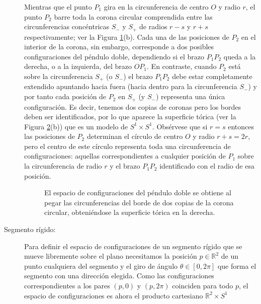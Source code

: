 \documentclass[\main/VD_completo.tex]{subfiles}
\begin{document}
\begin{description}
  Mientras que el punto $P_1$ gira en la circunferencia de centro $O$ y radio
  $r$, el punto $P_2$ barre toda la corona circular comprendida entre las
  circunferencias concéntricas $S_-$ y $S_+$ de radios $r-s$ y $r+s$
  respectivamente; ver la Figura \ref{fig20y30}(b). Cada una de las posiciones
  de $P_2$ en el interior de la corona, sin embargo, corresponde a dos posibles
  configuraciones del péndulo doble, dependiendo si el brazo $P_1P_2$ queda a la
  derecha, o a la izquierda, del brazo $OP_1$. En contraste, cuando $P_2$ está
  sobre la circunferencia $S_+$ (o $S_-$) el brazo $P_1P_2$ debe estar
  completamente extendido apuntando hacia fuera (hacia dentro para la
  circunferencia $S_-$) y por tanto cada posición de $P_2$ en $S_+$ (y $S_-$)
  representa una única configuración. Es decir, tenemos dos copias de coronas
  pero los bordes deben ser identificados, por lo que aparece la superficie
  tórica (ver la Figura \ref{fig40y50d}(b)) que es un modelo de $S^1 \times
  S^1$. Obsérvese que si $r=s$ entonces las posiciones de $P_2$ determinan el
  círculo de centro $O$ y radio $r+s = 2r$, pero el centro de este círculo
  representa toda una circunferencia de configuraciones: aquellas
  correspondientes a cualquier posición de $P_1$ sobre la circunferencia de
  radio $r$ y el brazo $P_1P_2$ identificado con el radio de esa posición.
	
  \begin{figure}[ht]
    \centering
    \qquad %
    \caption{}
    \label{fig20y30}
  \end{figure}

  \begin{figure}[ht]
    \centering
    \qquad %
    \caption{El espacio de configuraciones del péndulo doble se obtiene al pegar las circunferencias del borde de dos copias de la corona circular, obteniéndose la superficie tórica en la derecha.}
    \label{fig40y50d}
  \end{figure}

\item[Segmento rígido:] Para definir el espacio de configuraciones de un
  segmento rígido que se mueve libremente sobre el plano necesitamos la posición
  $p\in\mathbb{R}^{2}$ de un punto cualquiera del segmento y el giro de ángulo
  $\theta\in[0,2\pi]$ que forma el segmento con una dirección elegida. Como las
  configuraciones correspondientes a los pares $(p,0)$ y $(p,2\pi)$ coinciden
  para todo $p$, el espacio de configuraciones es ahora el producto cartesiano
  $\mathbb{R}^{2}\times S^{1}$
	

\end{description}
\end{document}
